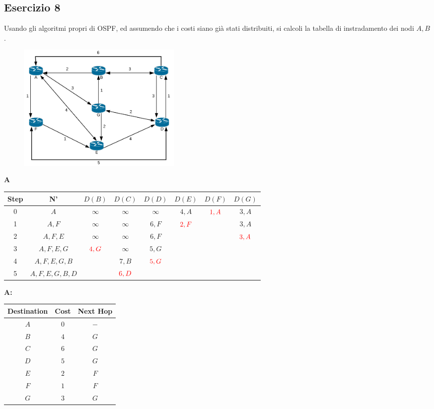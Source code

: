 \documentclass[10pt]{article}
\begin{document}
		\subsection{Esercizio 8}
			Usando gli algoritmi propri di OSPF, ed assumendo che i costi siano già stati distribuiti, si calcoli la tabella di instradamento dei nodi ${A,B}$.
			\begin{figure}[h]
				\centering
				\includegraphics[width=8cm]{es8}
			\end{figure}
			\begin{center}
				\textbf{A}
				\begin{tabular}{||c c c c c c c c||} 
					\hline
					Step & N' & $D(B)$ & $D(C)$ & $D(D)$ & $D(E)$ & $D(F)$ & $D(G)$ \\[0.5ex] 
					\hline\hline
					0 & $A$ & $\infty$ & $\infty$ & $\infty$ & $4,A$ &$\color{red} 1,A$ & $3,A$ \\
					\hline
					1 & $A,F$ & $\infty$ & $\infty$ & $6,F$ & $\color{red} 2,F$ & & $3,A$ \\
					\hline
					2 & $A,F,E$ & $\infty$ & $\infty$ & $6,F$ & & & $\color{red} 3,A$ \\
					\hline
					3 & $A,F,E,G$ & $\color{red} 4,G$ & $\infty$ & $5,G$ & & & \\
					\hline
					4 & $A,F,E,G,B$ & & $7,B$ & $\color{red} 5,G$ & & & \\
					\hline
					5 & $A,F,E,G,B,D$ & & $\color{red} 6,D$ & & & & \\[0.5ex] 
					\hline
				\end{tabular}
			\end{center}
			\begin{center}
				\textbf{A:}
				\begin{tabular}{||c || c || c||}
					\hline
					Destination & Cost & Next Hop \\[0.5ex] 
					\hline\hline
					$A$ & $0$ & $-$ \\
					$B$ & $4$ & $G$ \\
					$C$ & $6$ & $G$ \\
					$D$ & $5$ & $G$ \\
					$E$ & $2$ & $F$ \\
					$F$ & $1$ & $F$ \\
					$G$ & $3$ & $G$ \\[0.5ex] 
					\hline
				\end{tabular}
			\end{center}		
			
\end{document}
